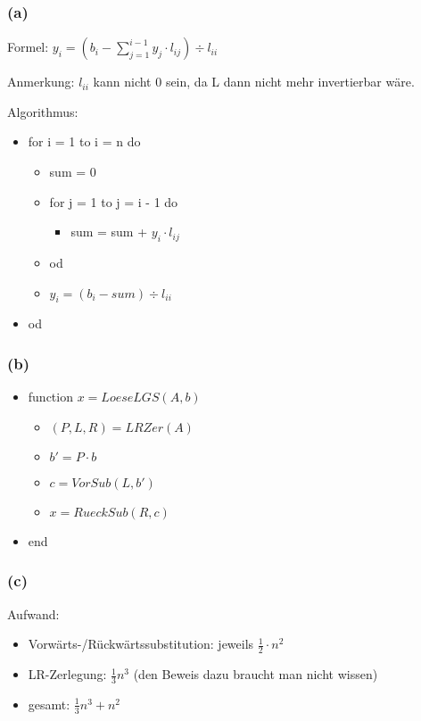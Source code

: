 \documentclass[a4paper]{article}
\begin{document}
\subsubsection*{(a)}
Formel: $y_i = (b_i - \sum_{j=1}^{i-1} y_j \cdot l_{ij} ) \div l_{ii} $

Anmerkung: $l_{ii}$ kann nicht $0$ sein, da L dann nicht mehr invertierbar wäre.

Algorithmus:
\begin{itemize}
\item for i = 1 to i = n do
\begin{itemize}
\item sum = 0
\item for j = 1 to j = i - 1 do
\begin{itemize}
\item sum = sum + $y_i \cdot l_{ij}$
\end{itemize}
\item od
\item $y_i = (b_i - sum) \div l_{ii}$
\end{itemize}
\item od
\end{itemize}

\subsubsection*{(b)}
\begin{itemize}
\item function $ x = LoeseLGS(A,b)$
\begin{itemize}
\item $(P,L,R) = LRZer(A)$
\item $b'=P \cdot b $
\item $c = VorSub(L,b') $
\item $x=RueckSub(R,c)$
\end{itemize}
\item end

\end{itemize}


\subsubsection*{(c)}
Aufwand:
\begin{itemize}
\item Vorwärts-/Rückwärtssubstitution: jeweils $\frac{1}{2} \cdot n^2$
\item LR-Zerlegung: $\frac{1}{3}n^3$ (den Beweis dazu braucht man nicht wissen)
\item gesamt: $\frac{1}{3}n^3+n^2$
\end{itemize}
\end{document}
